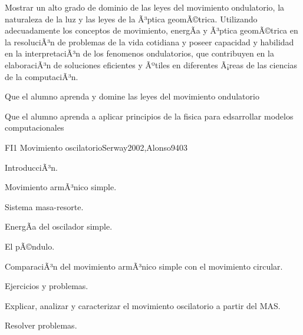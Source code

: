 \begin{syllabus}


\begin{justification}
Mostrar un alto grado de dominio de las leyes del movimiento ondulatorio,
la naturaleza de la luz y las leyes de la Ã³ptica geomÃ©trica.
Utilizando  adecuadamente los conceptos de movimiento, energÃ­a y Ã³ptica
geomÃ©trica en la resoluciÃ³n de problemas de la vida cotidiana y poseer
capacidad y habilidad en la interpretaciÃ³n de los fenomenos ondulatorios,
que contribuyen en la elaboraciÃ³n de soluciones eficientes y Ãºtiles en
diferentes Ã¡reas de las ciencias de la computaciÃ³n.
\end{justification}

\begin{goals}
\item Que el alumno aprenda y domine las leyes del movimiento ondulatorio
\item Que el alumno aprenda a aplicar principios de la fisica para edsarrollar modelos computacionales
\end{goals}

\begin{outcomes}
\end{outcomes}

\begin{unit}{FI1 Movimiento oscilatorio}{Serway2002,Alonso94}{0}{3}
\begin{topics}
      \item IntroducciÃ³n.
      \item Movimiento armÃ³nico simple.
      \item Sistema masa-resorte.
      \item EnergÃ­a del oscilador simple.
      \item El pÃ©ndulo.
      \item ComparaciÃ³n del movimiento armÃ³nico simple con el movimiento circular.
      \item Ejercicios y problemas.
   \end{topics}

   \begin{unitgoals}
      \item Explicar, analizar y caracterizar el movimiento oscilatorio a partir del MAS.
      \item Resolver problemas.
   \end{unitgoals}
\end{unit}


\end{syllabus}
